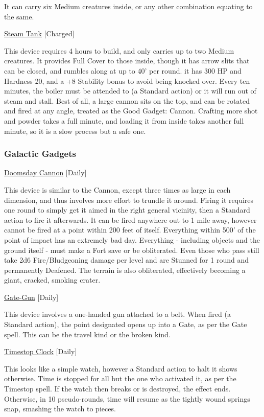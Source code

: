 \smallskip\noindent It can carry six Medium creatures inside, or any other combination equating to the same. 

\medskip\noindent\underline{Steam Tank} [Charged] 

\noindent This device requires 4 hours to build, and only carries up to two Medium creatures. It provides Full Cover to those inside, though it has arrow slits that can be closed, and rumbles along at up to 40' per round. it has 300 HP and Hardness 20, and a +8 Stability bonus to avoid being knocked over. Every ten minutes, the boiler must be attended to (a Standard action) or it will run out of steam and stall. Best of all, a large cannon sits on the top, and can be rotated and fired at any angle, treated as the Good Gadget: Cannon. Crafting more shot and powder takes a full minute, and loading it from inside takes another full minute, so it is a slow process but a safe one.

\subsubsection{Galactic Gadgets}

\noindent\underline{Doomsday Cannon} [Daily] 

\noindent This device is similar to the Cannon, except three times as large in each dimension, and thus involves more effort to trundle it around. Firing it requires one round to simply get it aimed in the right general vicinity, then a Standard action to fire it afterwards. It can be fired anywhere out to 1 mile away, however cannot be fired at a point within 200 feet of itself. Everything within 500' of the point of impact has an extremely bad day. Everything - including objects and the ground itself - must make a Fort save or be obliterated. Even those who pass still take 2d6 Fire/Bludgeoning damage per level and are Stunned for 1 round and permanently Deafened. The terrain is also obliterated, effectively becoming a giant, cracked, smoking crater. 

\medskip\noindent\underline{Gate-Gun} [Daily] 

\noindent This device involves a one-handed gun attached to a belt. When fired (a Standard action), the point designated opens up into a Gate, as per the Gate spell. This can be the travel kind or the broken kind. 

\medskip\noindent\underline{Timestop Clock} [Daily] 

\noindent This looks like a simple watch, however a Standard action to halt it shows otherwise. Time is stopped for all but the one who activated it, as per the Timestop spell. If the watch then breaks or is destroyed, the effect ends. Otherwise, in 10 pseudo-rounds, time will resume as the tightly wound springs snap, smashing the watch to pieces. 

